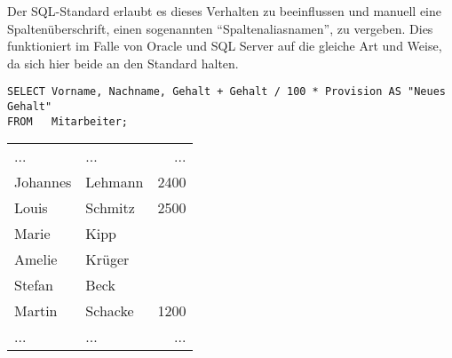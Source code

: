 Der SQL-Standard erlaubt es dieses Verhalten zu beeinflussen und manuell eine Spaltenüberschrift, einen sogenannten \enquote{Spaltenaliasnamen}, zu vergeben. Dies funktioniert im Falle von Oracle und SQL Server auf die gleiche Art und Weise, da sich hier beide an den Standard halten.
\begin{lstlisting}[language=oracle_sql,caption={Vergabe eines Spaltenaliasnamen},label=sql01_09]
SELECT Vorname, Nachname, Gehalt + Gehalt / 100 * Provision AS "Neues Gehalt"
FROM   Mitarbeiter;
        \end{lstlisting}
\begin{center}
    \begin{small}
        \tablehead{}
        \begin{msoraclesql}
            \begin{supertabular}{llr}
                ... & ... & ... \\
                Johannes & Lehmann & 2400 \\
                Louis & Schmitz & 2500 \\
                Marie & Kipp &  \\
                Amelie & Krüger &  \\
                Stefan & Beck &  \\
                Martin & Schacke & 1200 \\
                ... & ... & ... \\
            \end{supertabular}
        \end{msoraclesql}
    \end{small}
\end{center}

